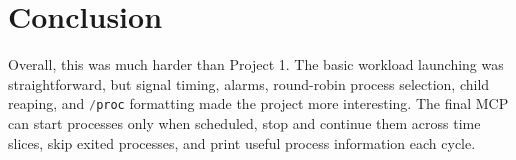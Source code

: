 \documentclass[12pt]{article}
\begin{document}
\section{Conclusion}
Overall, this was much harder than Project 1. The basic workload launching was straightforward, but signal timing, alarms, round-robin process selection, child reaping, and \lstinline[language=C]|/proc| formatting made the project more interesting. The final MCP can start processes only when scheduled, stop and continue them across time slices, skip exited processes, and print useful process information each cycle.
\end{document}
